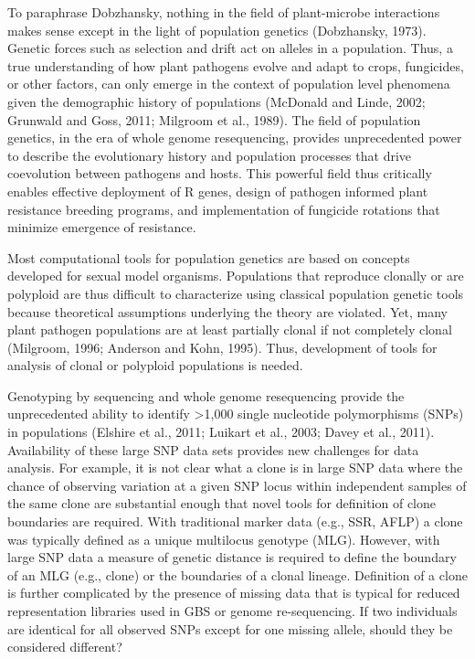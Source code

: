 \documentclass{frontiersSCNS} %
\begin{document}
To paraphrase Dobzhansky, nothing in the field of plant-microbe
interactions makes sense except in the light of population genetics
(Dobzhansky, 1973). Genetic forces such as selection and drift act on
alleles in a population. Thus, a true understanding of how plant
pathogens evolve and adapt to crops, fungicides, or other factors, can
only emerge in the context of population level phenomena given the
demographic history of populations (McDonald and Linde, 2002; Grunwald
and Goss, 2011; Milgroom et al., 1989). The field of population
genetics, in the era of whole genome resequencing, provides
unprecedented power to describe the evolutionary history and population
processes that drive coevolution between pathogens and hosts. This
powerful field thus critically enables effective deployment of R genes,
design of pathogen informed plant resistance breeding programs, and
implementation of fungicide rotations that minimize emergence of
resistance.

Most computational tools for population genetics are based on concepts
developed for sexual model organisms. Populations that reproduce
clonally or are polyploid are thus difficult to characterize using
classical population genetic tools because theoretical assumptions
underlying the theory are violated. Yet, many plant pathogen populations
are at least partially clonal if not completely clonal (Milgroom, 1996;
Anderson and Kohn, 1995). Thus, development of tools for analysis of
clonal or polyploid populations is needed.

Genotyping by sequencing and whole genome resequencing provide the
unprecedented ability to identify \textgreater{}1,000 single nucleotide
polymorphisms (SNPs) in populations (Elshire et al., 2011; Luikart et
al., 2003; Davey et al., 2011). Availability of these large SNP data
sets provides new challenges for data analysis. For example, it is not
clear what a clone is in large SNP data where the chance of observing
variation at a given SNP locus within independent samples of the same
clone are substantial enough that novel tools for definition of clone
boundaries are required. With traditional marker data (e.g., SSR, AFLP)
a clone was typically defined as a unique multilocus genotype (MLG).
However, with large SNP data a measure of genetic distance is required
to define the boundary of an MLG (e.g., clone) or the boundaries of a
clonal lineage. Definition of a clone is further complicated by the
presence of missing data that is typical for reduced representation
libraries used in GBS or genome re-sequencing. If two individuals are
identical for all observed SNPs except for one missing allele, should
they be considered different?
\end{document}
